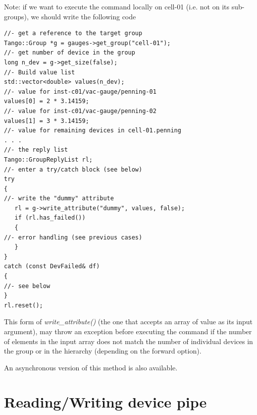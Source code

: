 Note: if we want to execute the command locally on \textquotedbl{}cell-01\textquotedbl{}
(i.e. not on its sub-groups), we should write the following code


\begin{verbatim}
//- get a reference to the target group
Tango::Group *g = gauges->get_group("cell-01");
//- get number of device in the group
long n_dev = g->get_size(false);
//- Build value list
std::vector<double> values(n_dev);
//- value for inst-c01/vac-gauge/penning-01
values[0] = 2 * 3.14159;
//- value for inst-c01/vac-gauge/penning-02
values[1] = 3 * 3.14159;
//- value for remaining devices in cell-01.penning
. . .
//- the reply list
Tango::GroupReplyList rl;
//- enter a try/catch block (see below)
try
{
//- write the "dummy" attribute
   rl = g->write_attribute("dummy", values, false);
   if (rl.has_failed())
   {
//- error handling (see previous cases)
   }
}
catch (const DevFailed& df)
{
//- see below
}
rl.reset();
\end{verbatim}


This form of \emph{write\_attribute()} (the
one that accepts an array of value as its input argument), may throw
an exception before executing the command if the number of elements
in the input array does not match the number of individual devices
in the group or in the hierarchy (depending on the forward option). 

An asynchronous version of this method is also available.


\section{Reading/Writing device pipe}

